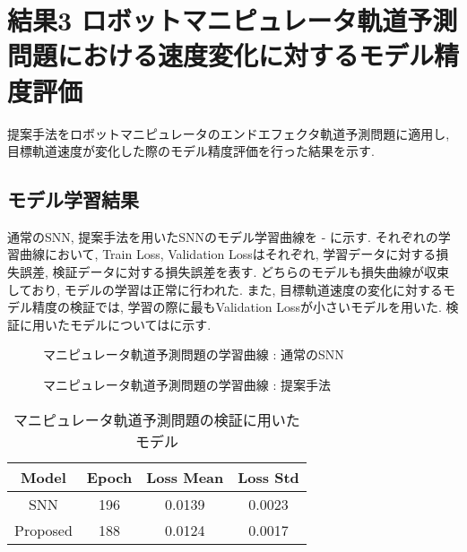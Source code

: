 \section{結果3 ロボットマニピュレータ軌道予測問題における速度変化に対するモデル精度評価}
提案手法をロボットマニピュレータのエンドエフェクタ軌道予測問題に適用し, 目標軌道速度が変化した際のモデル精度評価を行った結果を示す.

\subsection{モデル学習結果}
通常のSNN, 提案手法を用いたSNNのモデル学習曲線を - に示す.
それぞれの学習曲線において, Train Loss, Validation Lossはそれぞれ, 学習データに対する損失誤差, 検証データに対する損失誤差を表す.
どちらのモデルも損失曲線が収束しており, モデルの学習は正常に行われた.
また, 目標軌道速度の変化に対するモデル精度の検証では, 学習の際に最もValidation Lossが小さいモデルを用いた.
検証に用いたモデルについてはに示す.
\begin{figure}[htb]
    \centering
    
    \caption{マニピュレータ軌道予測問題の学習曲線 : 通常のSNN}
    \label{fig:result3:1:snn}
\end{figure}
\begin{figure}[htb]
    \centering
    
    \caption{マニピュレータ軌道予測問題の学習曲線 : 提案手法}
    \label{fig:result3:1:proposed}
\end{figure}

\begin{table}[htb]
    \centering
    \caption{マニピュレータ軌道予測問題の検証に用いたモデル}
    \label{tab:result3:model:parameter}
    \begin{tabular}{cccc}
        \hline
        \textbf{Model}& \textbf{Epoch} & \textbf{Loss Mean} & \textbf{Loss Std}\\
        \hline
        SNN &  196 & 0.0139 & 0.0023\\ %
        Proposed & 188 & 0.0124 & 0.0017\\
        \hline
    \end{tabular}
\end{table}
\clearpage


